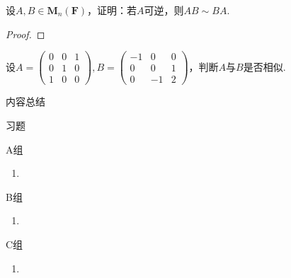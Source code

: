 \begin{example}
    设$A,B\in \mathbf{M}_n(\mathbf{F})$，证明：若$A$可逆，则$AB\sim BA$.
\end{example}

\begin{proof}

\end{proof}

\begin{example}
    设$A=\begin{pmatrix}
            0 & 0 & 1 \\ 0 & 1 & 0 \\ 1 & 0 & 0
        \end{pmatrix},B=\begin{pmatrix}
            -1 & 0 & 0 \\ 0 & 0 & 1 \\ 0 & -1 & 2
        \end{pmatrix}$，判断$A$与$B$是否相似.
\end{example}

\begin{solution}

\end{solution}

\vspace{2ex}
\centerline{\heiti \Large 内容总结}

\vspace{2ex}
\centerline{\heiti \Large 习题}

\vspace{2ex}
{\kaishu }
\begin{flushright}
    \kaishu

\end{flushright}

\centerline{\heiti A组}
\begin{enumerate}
    \item
\end{enumerate}

\centerline{\heiti B组}
\begin{enumerate}
    \item
\end{enumerate}

\centerline{\heiti C组}
\begin{enumerate}
    \item
\end{enumerate}
